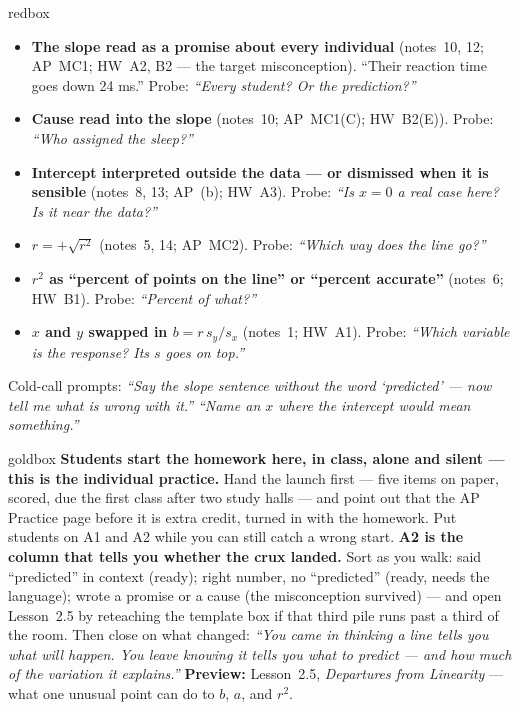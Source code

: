 \documentclass[10pt]{article}
\begin{document}
\boxguard
\begin{skillbox}{redbox}
\begin{itemize}[leftmargin=1.2em, nosep]
  \item \textbf{The slope read as a promise about every individual} (notes~10, 12; AP~MC1;
        HW~A2, B2 --- the target misconception). ``Their reaction time goes down 24 ms.'' Probe:
        \emph{``Every student? Or the prediction?''}
  \item \textbf{Cause read into the slope} (notes~10; AP~MC1(C); HW~B2(E)). Probe: \emph{``Who
        assigned the sleep?''}
  \item \textbf{Intercept interpreted outside the data --- or dismissed when it is sensible}
        (notes~8, 13; AP~(b); HW~A3). Probe: \emph{``Is $x = 0$ a real case here? Is it near
        the data?''}
  \item \textbf{$r = +\sqrt{r^2}$} (notes~5, 14; AP~MC2). Probe: \emph{``Which way does the
        line go?''}
  \item \textbf{$r^2$ as ``percent of points on the line'' or ``percent accurate''} (notes~6;
        HW~B1). Probe: \emph{``Percent of \emph{what}?''}
  \item \textbf{$x$ and $y$ swapped in $b = r\,s_y/s_x$} (notes~1; HW~A1). Probe:
        \emph{``Which variable is the response? Its $s$ goes on top.''}
\end{itemize}
Cold-call prompts: \emph{``Say the slope sentence without the word `predicted' --- now tell me
what is wrong with it.''} \quad \emph{``Name an $x$ where the intercept would mean something.''}
\end{skillbox}

\boxguard
\begin{skillbox}{goldbox}
\textbf{Students start the homework here, in class, alone and silent --- this is the individual
practice.} Hand the launch first --- five items on paper, scored, due the first class after two
study halls --- and point out that the AP Practice page before it is extra credit, turned in with the homework. Put students on A1 and A2 while you can still catch a wrong start. \textbf{A2 is the
column that tells you whether the crux landed.} Sort as you walk: said ``predicted'' in context
(ready); right number, no ``predicted'' (ready, needs the language); wrote a promise or a cause
(the misconception survived) --- and open Lesson~2.5 by reteaching the template box if that
third pile runs past a third of the room. Then close on what changed: \emph{``You came in
thinking a line tells you what will happen. You leave knowing it tells you what to
\emph{predict} --- and how much of the variation it explains.''} \textbf{Preview:}
Lesson~2.5, \emph{Departures from Linearity} --- what one unusual point can do to $b$, $a$, and
$r^2$.
\end{skillbox}
\end{document}
